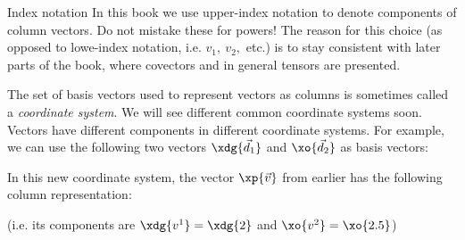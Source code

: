 \begin{note}{Index notation}{}
  In this book we use upper-index notation to denote components of column vectors. Do not mistake these for powers! The reason for this choice (as opposed to lowe-index notation, i.e. $v_{1},\ v_{2},$ etc.) is to stay consistent with later parts of the book, where covectors and in general tensors are presented.
\end{note}

The set of basis vectors used to represent vectors as columns is sometimes called a \emph{coordinate system}. We will see different common coordinate systems soon. Vectors have different components in different coordinate systems. For example, we can use the following two vectors $\xdg{\vec{d}_{1}}$ and $\xo{\vec{d}_{2}}$ as basis vectors:

\begin{center}
\end{center}

In this new coordinate system, the vector $\xp{\vec{v}}$ from earlier has the following column representation:

\vspace{-1.2em}
\begin{center}
\end{center}
(i.e. its components are $\xdg{v^{1}}=\xdg{2}$ and $\xo{v^{2}}=\xo{2.5}$)

